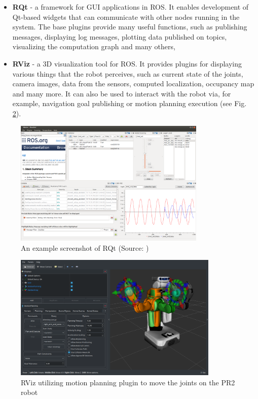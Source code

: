 \documentclass[english,inz,shortabstract]{iithesis}
\begin{document}
        \begin{itemize}[itemsep=0pt, parsep=2pt, topsep=0pt]
            \item \textbf{RQt} - a framework for GUI applications in ROS. It enables development of Qt-based widgets that can communicate with other nodes running in the system. The base plugins provide many useful functions, such as publishing messages, displaying log messages, plotting data published on topics, visualizing the computation graph and many others,
            \item \textbf{RViz} - a 3D visualization tool for ROS. It provides plugins for displaying various things that the robot perceives, such as current state of the joints, camera images, data from the sensors, computed localization, occupancy map and many more. It can also be used to interact with the robot via, for example, navigation goal publishing or motion planning execution (see Fig. \ref{fig:rviz_pr2}).
        \end{itemize}

        \begin{figure}[ht]
            \centering
            \captionsetup{margin=2cm}
            \includegraphics[height=6cm]{img/rqt.png}
            \caption{An example screenshot of RQt (Source: \cite{ros:rqt})}
            \label{fig:rqt}
        \end{figure}

\pagebreak

        \begin{figure}[ht]
            \centering
            \captionsetup{margin=2cm}
            \includegraphics[height=6cm]{img/rviz_pr2.png}
            \caption{RViz utilizing motion planning plugin to move the joints on the PR2 robot}
            \label{fig:rviz_pr2}
        \end{figure}
\end{document}
